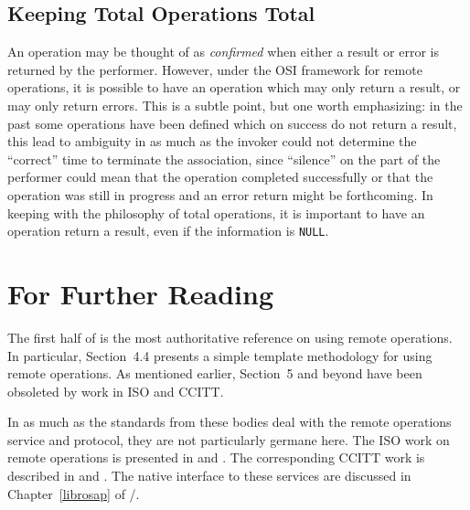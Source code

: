 \subsection	{Keeping Total Operations Total}
An operation may be thought of as {\em confirmed\/} when either a result or
error is returned by the performer.
However,
under the OSI framework for remote operations,
it is possible to have an operation which may only return a result,
or may only return errors.
This is a subtle point,
but one worth emphasizing:
in the past some operations have been defined which on success do not return
a result,
this lead to ambiguity in as much as the invoker could not determine the
``correct'' time to terminate the association,
since ``silence'' on the part of the performer could mean that the operation
completed successfully or that the operation was still in progress and an
error return might be forthcoming.
In keeping with the philosophy of total operations,
it is important to have an operation return a result,
even if the information is \verb"NULL".

\section	{For Further Reading}
The first half of \cite{ECMA.ROS} is the most authoritative reference on
using remote operations.
In particular, Section~4.4
presents a simple template methodology for using remote operations.
As mentioned earlier,
Section~5 and beyond have been obsoleted by work in ISO and CCITT.

In as much as the standards from these bodies deal with the remote operations
service and protocol,
they are not particularly germane here.
The ISO work on remote operations is presented in
\cite{ISO.ROS.Service} and \cite{ISO.ROS.Protocol}.
The corresponding CCITT work is
described in \cite{CCITT.ROS.Service} and \cite{CCITT.ROS.Protocol}.
The native interface to these services are discussed in
Chapter~\ref{librosap} of \volone/.
